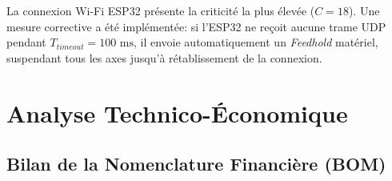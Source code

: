 La connexion Wi-Fi ESP32 présente la criticité la plus élevée ($C = 18$). Une mesure corrective a été implémentée: si l'ESP32 ne reçoit aucune trame UDP pendant $T_{timeout} = 100\text{ ms}$, il envoie automatiquement un \textit{Feedhold} matériel, suspendant tous les axes jusqu'à rétablissement de la connexion.

\section{Analyse Technico-Économique}

\subsection{Bilan de la Nomenclature Financière (BOM)}

